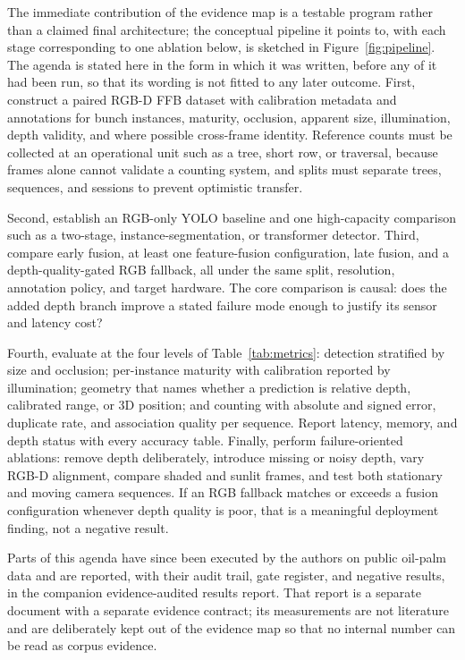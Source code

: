 The immediate contribution of the evidence map is a testable program rather than a claimed final architecture; the conceptual pipeline it points to, with each stage corresponding to one ablation below, is sketched in Figure~\ref{fig:pipeline}. The agenda is stated here in the form in which it was written, before any of it had been run, so that its wording is not fitted to any later outcome. First, construct a paired RGB-D FFB dataset with calibration metadata and annotations for bunch instances, maturity, occlusion, apparent size, illumination, depth validity, and where possible cross-frame identity. Reference counts must be collected at an operational unit such as a tree, short row, or traversal, because frames alone cannot validate a counting system, and splits must separate trees, sequences, and sessions to prevent optimistic transfer.

Second, establish an RGB-only YOLO baseline and one high-capacity comparison such as a two-stage, instance-segmentation, or transformer detector. Third, compare early fusion, at least one feature-fusion configuration, late fusion, and a depth-quality-gated RGB fallback, all under the same split, resolution, annotation policy, and target hardware. The core comparison is causal: does the added depth branch improve a stated failure mode enough to justify its sensor and latency cost?

Fourth, evaluate at the four levels of Table~\ref{tab:metrics}: detection stratified by size and occlusion; per-instance maturity with calibration reported by illumination; geometry that names whether a prediction is relative depth, calibrated range, or 3D position; and counting with absolute and signed error, duplicate rate, and association quality per sequence. Report latency, memory, and depth status with every accuracy table. Finally, perform failure-oriented ablations: remove depth deliberately, introduce missing or noisy depth, vary RGB-D alignment, compare shaded and sunlit frames, and test both stationary and moving camera sequences. If an RGB fallback matches or exceeds a fusion configuration whenever depth quality is poor, that is a meaningful deployment finding, not a negative result.

Parts of this agenda have since been executed by the authors on public oil-palm data and are reported, with their audit trail, gate register, and negative results, in the companion evidence-audited results report. That report is a separate document with a separate evidence contract; its measurements are not literature and are deliberately kept out of the evidence map so that no internal number can be read as corpus evidence.

